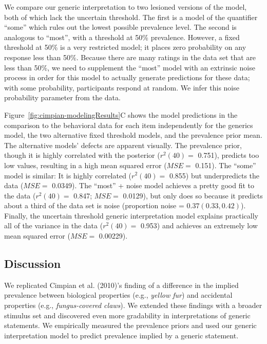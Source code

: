 \documentclass[floatsintext,doc]{apa6}
\theoremstyle{definition}
\theoremstyle{definition}
\theoremstyle{definition}
\theoremstyle{remark}
\begin{document}
We compare our generic interpretation to two lesioned versions of the
model, both of which lack the uncertain threshold. The first is a model
of the quantifier \enquote{some} which rules out the lowest possible
prevalence level. The second is analogous to \enquote{most}, with a
threshold at 50\% prevalence. However, a fixed threshold at 50\% is a
very restricted model; it places zero probability on any response less
than 50\%. Because there are many ratings in the data set that are less
than 50\%, we need to supplement the \enquote{most} model with an
extrinsic noise process in order for this model to actually generate
predictions for these data; with some probability, participants respond
at random. We infer this noise probability parameter from
the data.

Figure~\ref{fig:cimpian-modelingResults}C shows the model predictions in
the comparison to the behavioral data for each item independently for
the generics model, the two alternative fixed threshold models, and the
prevalence prior mean. The alternative models' defects are apparent
visually. The prevalence prior, though it is highly correlated with the
posterior (\(r^2(40)=\) 0.751), predicts too low values, resulting in a
high mean squared error (\(MSE=\) 0.151). The \enquote{some} model is
similar: It is highly correlated (\(r^2(40)=\) 0.855) but underpredicts
the data (\(MSE=\) 0.0349). The \enquote{most} + noise model achieves a
pretty good fit to the data (\(r^2(40) =\) 0.847; \(MSE=\) 0.0129), but
only does so because it predicts about a third of the data set is noise
(proportion noise = \(0.37 (0.33, 0.42)\)). Finally, the uncertain
threshold generic interpretation model explains practically all of the
variance in the data (\(r^2(40) =\) 0.953) and achieves an extremely low
mean squared error (\(MSE =\) 0.00229).

\subsection{Discussion}\label{discussion}

We replicated Cimpian et al. (2010)'s finding of a difference in the
implied prevalence between biological properties (e.g., \emph{yellow
fur}) and accidental properties (e.g., \emph{fungus-covered claws}). We
extended these findings with a broader stimulus set and discovered even
more gradability in interpretations of generic statements. We
empirically measured the prevalence priors and used our generic
interpretation model to predict prevalence implied by a generic
statement.
\end{document}
